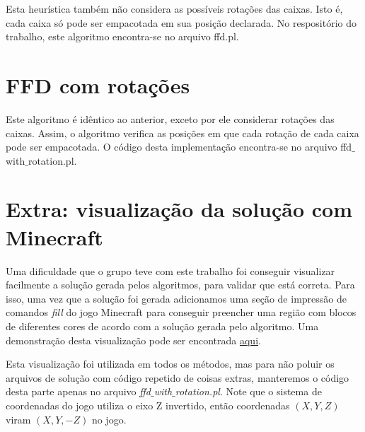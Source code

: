 \documentclass[12pt]{article}
\begin{document}
Esta heurística também não considera as possíveis rotações das caixas. Isto é, cada caixa só pode ser empacotada em sua posição declarada. No respositório do trabalho, este algoritmo encontra-se no arquivo ffd.pl.


\section{FFD com rotações}

Este algoritmo é idêntico ao anterior, exceto por ele considerar rotações das caixas. Assim, o algoritmo verifica as posições em que cada rotação de cada caixa pode ser empacotada. O código desta implementação encontra-se no arquivo ffd$\_$with$\_$rotation.pl.

\section{Extra: visualização da solução com Minecraft}

Uma dificuldade que o grupo teve com este trabalho foi conseguir visualizar facilmente a solução gerada pelos algoritmos, para validar que está correta. Para isso, uma vez que a solução foi gerada adicionamos uma seção de impressão de comandos \textit{fill} do jogo Minecraft para conseguir preencher uma região com blocos de diferentes cores de acordo com a solução gerada pelo algoritmo. Uma demonstração desta visualização pode ser encontrada \href{https://www.youtube.com/watch?v=qInZZb9y1dQ}{aqui}.

Esta visualização foi utilizada em todos os métodos, mas para não poluir os arquivos de solução com código repetido de coisas extras, manteremos o código desta parte apenas no arquivo \textit{ffd$\_$with$\_$rotation.pl}. Note que o sistema de coordenadas do jogo utiliza o eixo Z invertido, então coordenadas $(X, Y, Z)$ viram $(X, Y, -Z)$ no jogo.
\end{document}
